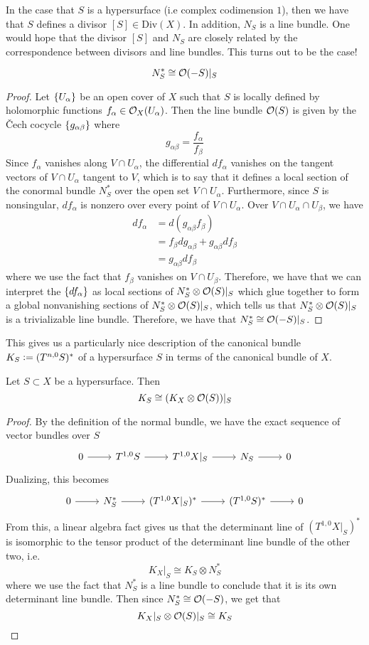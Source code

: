 In the case that $S$ is a hypersurface (i.e complex codimension $1$), then we have that
$S$ defines a divisor $[S] \in \mathrm{Div}(X)$. In addition, $N_S$ is a line
bundle. One would hope that the divisor $[S]$ and $N_S$ are closely related by the
correspondence between divisors and line bundles. This turns out to be the case!
%
\begin{prop}
\[
N^*_S \cong \mathcal{O}(-S)\vert_{S}
\]
\end{prop}
%
\begin{proof}
Let $\left\lbrace U_\alpha \right\rbrace$ be an open cover of $X$ such that $S$ is locally defined
by holomorphic functions $f_\alpha \in \mathcal{O}_X(U_\alpha)$. Then the line bundle
$\mathcal{O}(S)$ is given by the \v{C}ech cocycle $\left\lbrace g_{\alpha\beta} \right\rbrace$ where
\[
g_{\alpha\beta} = \frac{f_\alpha}{f_\beta}
\]
Since $f_\alpha$ vanishes along $V \cap U_\alpha$, the differential $df_\alpha$
vanishes on the tangent vectors of $V \cap U_\alpha$ tangent to $V$, which is to say
that it defines a local section of the conormal bundle $N^*_S$ over the open set
$V \cap U_\alpha$. Furthermore, since $S$ is nonsingular, $df_\alpha$ is nonzero
over every point of $V \cap U_\alpha$. Over $V \cap U_\alpha \cap U_\beta$, we have
\begin{align*}
df_\alpha &= d(g_{\alpha\beta}f_\beta) \\
&= f_\beta dg_{\alpha\beta} + g_{\alpha\beta} df_\beta \\
&= g_{\alpha\beta}df_\beta
\end{align*}
where we use the fact that $f_\beta$ vanishes on $V \cap U_\beta$. Therefore, we have
that we can interpret the $\left\lbrace df_\alpha \right\rbrace$ as local sections of
$N_S^* \otimes \mathcal{O}(S)\vert_S$ which glue together to form a global nonvanishing sections
of $N_S^* \otimes \mathcal{O}(S)\vert_S$, which tells us that $N_S^* \otimes \mathcal{O}(S)\vert_S$ is
a trivializable line bundle. Therefore, we have that $N_S^* \cong \mathcal{O}(-S)\vert_S$.
\end{proof}
%
This gives us a particularly nice description of the canonical bundle
$K_S \vcentcolon= (T^{n,0}S)^*$ of a hypersurface $S$ in terms of the canonical bundle of $X$.
%
\begin{prop}
Let $S \subset X$ be a hypersurface. Then
\[
K_S \cong (K_X \otimes \mathcal{O}(S))\vert_S
\]
\end{prop}
%
\begin{proof}
By the definition of the normal bundle, we have the exact sequence of vector bundles
over $S$
\[\begin{tikzcd}
0 \ar[r] & T^{1,0}S \ar[r] & T^{1,0}X\vert_S \ar[r] & N_S \ar[r] & 0
\end{tikzcd}\]
Dualizing, this becomes
\[\begin{tikzcd}
0 \ar[r] & N_S^* \ar[r] & (T^{1,0}X\vert_S)^* \ar[r] & (T^{1,0}S)^* \ar[r] & 0
\end{tikzcd}\]
From this, a linear algebra fact gives us that the determinant line of
$(T^{1,0}X\vert_S)^*$ is isomorphic to the tensor product of the determinant
line bundle of the other two, i.e.
\[
K_X\vert_S \cong K_S \otimes N_S^*
\]
where we use the fact that $N_S^*$ is a line bundle to conclude that it is its own
determinant line bundle. Then since $N_S^* \cong \mathcal{O}(-S)$, we get that
\[
K_X\vert_S \otimes \mathcal{O}(S)\vert_S \cong K_S
\]
\end{proof}
